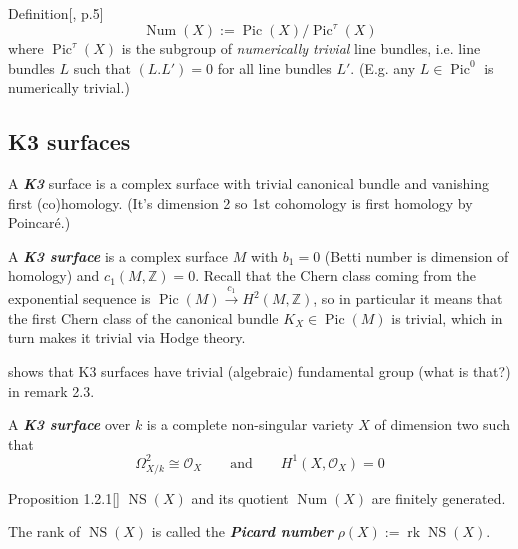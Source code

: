 \begin{thing4}{Definition}[\cite{huk}, p.5]\label{prop:}\leavevmode
\[\operatorname{Num}(X):=\operatorname{Pic}(X)/\operatorname{Pic}^\tau(X)\]
where \(\operatorname{Pic}^\tau(X)\) is the subgroup of \textit{numerically trivial} line bundles, i.e. line bundles \(L\) such that \((L.L')=0\) for all line bundles \(L'\). (E.g. any  \(L \in \operatorname{Pic}^0\) is numerically trivial.) 
\end{thing4}

\subsection{K3 surfaces}
\begin{defn}[dani]\leavevmode
A \textit{\textbf{K3}} surface is a complex surface with trivial canonical bundle and vanishing first (co)homology. (It's dimension 2 so 1st cohomology is first homology by Poincaré.)
\end{defn}

\begin{defn}[K3 course]\leavevmode
A \textit{\textbf{K3 surface}} is a complex surface \(M\) with \(b_1=0\) (Betti number is dimension of homology) and \(c_1(M,\mathbb{Z})=0\). Recall that the Chern class coming from the exponential sequence is \(\operatorname{Pic}(M) \xrightarrow{c_1}H^{2}(M,\mathbb{Z})\), so in particular it means that the first Chern class of the canonical bundle \(K_X \in \operatorname{Pic}(M)\) is trivial, which in turn makes it trivial via Hodge theory.
\end{defn}

\begin{remark}\leavevmode
\cite{huk} shows that K3 surfaces have trivial (algebraic) fundamental group (what is that?) in remark 2.3.
\end{remark}

\begin{defn}\leavevmode
A \textit{\textbf{K3 surface}} over \(k\) is a complete non-singular variety \(X\) of dimension two such that
 \[\Omega^2_{X/k}\cong \mathcal{O}_X\qquad \text{and} \qquad H^{1}(X,\mathcal{O}_X)=0\]
\end{defn}

\begin{thing4}{Proposition 1.2.1}[\cite{huk}]\leavevmode
\(\operatorname{NS}(X)\) and its quotient  \(\operatorname{Num}(X)\) are finitely generated.

The rank of \(\operatorname{NS}(X)\) is called the \textit{\textbf{Picard number}} \(\rho(X):=\operatorname{rk}\operatorname{NS}(X)\).
\end{thing4}

